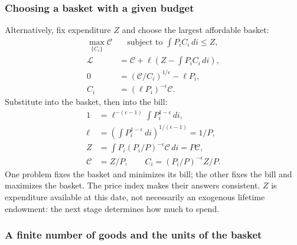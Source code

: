 \subsubsection{Choosing a basket with a given budget}

Alternatively, fix expenditure $Z$ and choose the largest affordable basket:
\begin{align}
 \max_{\{C_i\}}\mathcal C&\quad\text{subject to }\int P_iC_i\,di\leq Z,\\
 \mathcal L&=\mathcal C+\ell\left(Z-\int P_iC_i\,di\right),\\
 0&=(\mathcal C/C_i)^{1/\epsilon}-\ell P_i,\\
 C_i&=(\ell P_i)^{-\epsilon}\mathcal C.
\end{align}
Substitute into the basket, then into the bill:
\begin{align}
 1&=\ell^{-(\epsilon-1)}\int P_i^{1-\epsilon}\,di,\\
 \ell&=\left(\int P_i^{1-\epsilon}\,di\right)^{1/(\epsilon-1)}=1/P,\\
 Z&=\int P_i(P_i/P)^{-\epsilon}\mathcal C\,di=P\mathcal C,\\
 \mathcal C&=Z/P,\qquad C_i=(P_i/P)^{-\epsilon}Z/P.
\end{align}
One problem fixes the basket and minimizes its bill; the other fixes the bill
and maximizes the basket. The price index makes their answers consistent.
$Z$ is expenditure available at this date, not necessarily an exogenous lifetime
endowment: the next stage determines how much to spend.

\subsubsection{A finite number of goods and the units of the basket}

